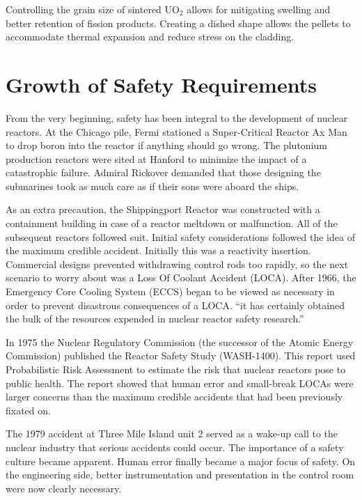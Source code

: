 Controlling the grain size of sintered UO$_2$ allows for mitigating swelling and better retention of fission products. Creating a dished shape allows the pellets to accommodate thermal expansion and reduce stress on the cladding.  


\section{Growth of Safety Requirements}
From the very beginning, safety has been integral to the development of nuclear reactors. At the Chicago pile, Fermi stationed a Super-Critical Reactor Ax Man to drop boron into the reactor if anything should go wrong.
The plutonium production reactors were sited at Hanford to minimize the impact of a catastrophic failure.
Admiral Rickover demanded that those designing the submarines took as much care as if their sons were aboard the ships.

As an extra precaution, the Shippingport Reactor was constructed with a containment building in case of a reactor meltdown or malfunction. All of the subsequent reactors followed suit. 
Initial safety considerations followed the idea of the maximum credible accident. Initially this was a reactivity insertion. Commercial designs prevented withdrawing control rods too rapidly, so the next scenario to worry about was a Loss Of Coolant Accident (LOCA).
After 1966, the Emergency Core Cooling System (ECCS) began to be viewed as necessary in order to prevent disastrous consequences of a LOCA.  ``it has certainly obtained the bulk of the resources expended in nuclear reactor safety research.''\cite{Safety_website}

In 1975 the Nuclear Regulatory Commission (the successor of the Atomic Energy Commission) published the Reactor Safety Study (WASH-1400). This report used Probabilistic Risk Assessment to estimate the risk that nuclear reactors pose to public health. The report showed that human error and small-break LOCAs were larger concerns than the maximum credible accidents that had been previously fixated on.

The 1979 accident at Three Mile Island unit 2 served as a wake-up call to the nuclear industry that serious accidents could occur. The importance of a safety culture became apparent. Human error finally became a major focus of safety. On the engineering side, better instrumentation and presentation in the control room were now clearly necessary. 

